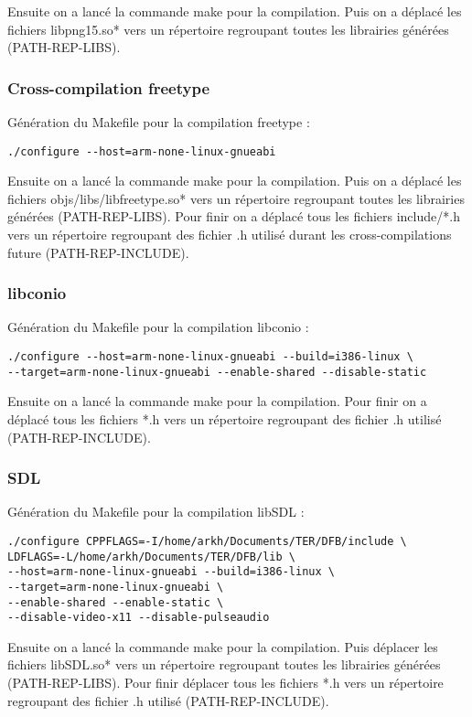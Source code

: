 Ensuite on a lancé la commande make pour la compilation.
Puis on a  déplacé les fichiers libpng15.so* vers un répertoire regroupant toutes les librairies générées (PATH-REP-LIBS).

\subsubsection{Cross-compilation freetype}
Génération du Makefile pour la compilation freetype :

\begin{lstlisting}
./configure --host=arm-none-linux-gnueabi
\end{lstlisting}

Ensuite on a lancé la commande make pour la compilation.
Puis on a déplacé les fichiers objs/libs/libfreetype.so* vers un répertoire regroupant toutes les librairies générées (PATH-REP-LIBS).
Pour finir on a déplacé tous les fichiers include/*.h vers un répertoire regroupant des fichier .h utilisé durant les cross-compilations future (PATH-REP-INCLUDE).

\subsubsection{libconio}
Génération du Makefile pour la compilation libconio :

\begin{lstlisting}
./configure --host=arm-none-linux-gnueabi --build=i386-linux \
--target=arm-none-linux-gnueabi --enable-shared --disable-static
\end{lstlisting}
Ensuite on a lancé la commande make pour la compilation.
Pour finir on a déplacé tous les fichiers *.h vers un répertoire regroupant des fichier .h utilisé (PATH-REP-INCLUDE).

\subsubsection{SDL}
Génération du Makefile pour la compilation libSDL :

\begin{lstlisting}
./configure CPPFLAGS=-I/home/arkh/Documents/TER/DFB/include \ 
LDFLAGS=-L/home/arkh/Documents/TER/DFB/lib \
--host=arm-none-linux-gnueabi --build=i386-linux \ 
--target=arm-none-linux-gnueabi \
--enable-shared --enable-static \
--disable-video-x11 --disable-pulseaudio
\end{lstlisting}

Ensuite on a lancé la commande make pour la compilation.
Puis déplacer les fichiers libSDL.so* vers un répertoire regroupant toutes les librairies générées (PATH-REP-LIBS).
Pour finir déplacer tous les fichiers *.h vers un répertoire regroupant des fichier .h utilisé (PATH-REP-INCLUDE).

